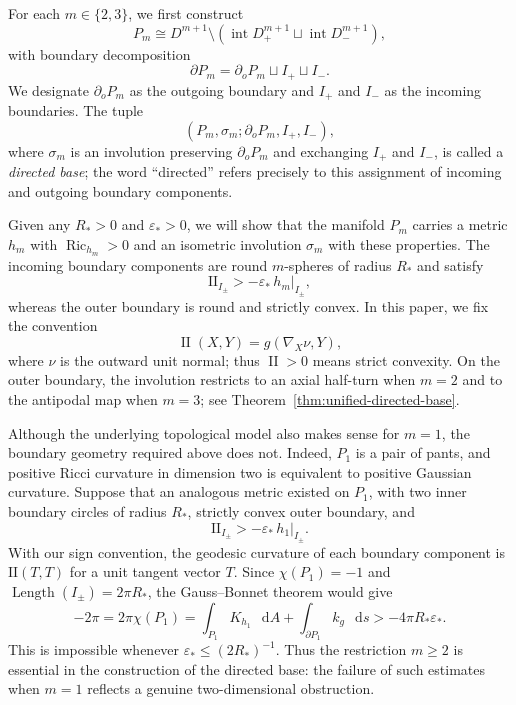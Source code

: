 \documentclass[11pt,reqno]{amsart}
\theoremstyle{definition}
\numberwithin{equation}{section}
\DeclareMathOperator{\Ric}{Ric}
\DeclareMathOperator{\II}{II}
\newcommand{\dd}{\mathop{}\!\mathrm d}
\begin{document}
For each $m\in\{2,3\}$, we first construct
\[
 P_m\cong
 D^{m+1}\setminus
 \left(
 \operatorname{int}D^{m+1}_+
 \sqcup
 \operatorname{int}D^{m+1}_-
 \right),
\]
with boundary decomposition
\[
 \partial P_m=\partial_oP_m\sqcup I_+\sqcup I_-.
\]
We designate $\partial_oP_m$ as the outgoing boundary and $I_+$ and
$I_-$ as the incoming boundaries.  The tuple
\begin{equation}\label{def:directed-base}
 (P_m,\sigma_m;\partial_oP_m,I_+,I_-),
\end{equation}
where $\sigma_m$ is an involution preserving $\partial_oP_m$ and
exchanging $I_+$ and $I_-$, is called a \emph{directed base}; the word
``directed'' refers precisely to this assignment of incoming and outgoing
boundary components.

Given any $R_*>0$ and $\varepsilon_*>0$, we will show that the manifold $P_m$ carries a
metric $h_m$ with $\Ric_{h_m}>0$ and an isometric involution $\sigma_m$
with these properties.  The incoming boundary components
are round $m$-spheres of radius $R_*$ and satisfy
\[
 \mathrm{II}_{I_\pm}
 >
 -\varepsilon_*\,h_m|_{I_\pm},
\]
whereas the outer boundary is round and strictly convex. In this paper, we fix the convention
\[
 \II(X,Y)=g(\nabla_X\nu,Y),
\]
where \(\nu\) is the outward unit normal; thus \(\II>0\) means strict convexity.  
On the outer
boundary, the involution restricts to an axial half-turn when $m=2$ and
to the antipodal map when $m=3$; see
Theorem~\ref{thm:unified-directed-base}.

Although the underlying topological model also makes sense for $m=1$,
the boundary geometry required above does not.  Indeed, $P_1$ is a pair
of pants, and positive Ricci curvature in dimension two is equivalent
to positive Gaussian curvature.  Suppose that an analogous metric
existed on $P_1$, with two inner boundary circles of radius $R_*$,
strictly convex outer boundary, and
\[
 \mathrm{II}_{I_\pm}
 >
 -\varepsilon_*\,h_1|_{I_\pm}.
\]
With our sign convention, the geodesic curvature of each boundary
component is $\mathrm{II}(T,T)$ for a unit tangent vector $T$.
Since $\chi(P_1)=-1$ and
$\operatorname{Length}(I_\pm)=2\pi R_*$, the Gauss--Bonnet theorem would
give
\[
 -2\pi
 =
 2\pi\chi(P_1)
 =
 \int_{P_1}K_{h_1}\,\dd A
 +
 \int_{\partial P_1}k_g\,\dd s
 >
 -4\pi R_*\varepsilon_*.
\]
This is impossible whenever
$\varepsilon_*\le (2R_*)^{-1}$.  Thus the restriction $m\ge2$ is
essential in the construction of the directed base: the failure of
such estimates when $m=1$ reflects a genuine
two-dimensional obstruction.
\end{document}
